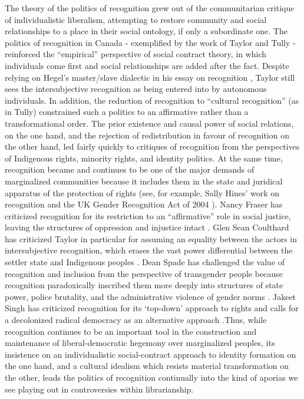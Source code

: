 \documentclass[12pt,oneside]{memoir}
\begin{document}
The theory of the politics of recognition grew out of the communitarian critique of individualistic liberalism, attempting to restore community and social relationships to a place in their social ontology, if only a subordinate one. The politics of recognition in Canada - exemplified by the work of Taylor and Tully - reinforced the ``empirical'' perspective of social contract theory, in which individuals come first and social relationships are added after the fact. Despite relying on Hegel's master/slave dialectic in his essay on recognition \citep{Taylor1992}, Taylor still sees the intersubjective recognition as being entered into by autonomous individuals. In addition, the reduction of recognition to ``cultural recognition'' (as in Tully) constrained such a politics to an affirmative rather than a transformational order.
The prior existence and causal power of social relations, on the one hand, and the rejection of redistribution in favour of recognition on the other hand, led fairly quickly to critiques of recognition from the perspectives of Indigenous rights, minority rights, and identity politics. At the same time, recognition became and continues to be one of the major demands of marginalized communities because it includes them in the state and juridical apparatus of the protection of rights (see, for example, Sally Hines' work on recognition and the UK Gender Recognition Act of 2004 \citep{Hines2013}). Nancy Fraser has criticized recognition for its restriction to an ``affirmative'' role in social justice, leaving the structures of oppression and injustice intact \citep{fraser-justice, fraser-honneth}. Glen Sean Coulthard has criticized Taylor in particular for assuming an equality between the actors in intersubjective recognition, which erases the vast power differential between the settler state and Indigenous peoples \citep{coulthard2014}. Dean Spade has challenged the value of recognition and inclusion from the perspective of transgender people because recognition paradoxically inscribed them more deeply into structures of state power, police brutality, and the administrative violence of gender norms \citep{Spade2015}. Jakeet Singh has criticized recognition for its `top-down' approach to rights \citep{singh-recognition} and calls for a decolonized radical democracy as an alternative approach \citep{singh-democracy}.Thus, while recognition continues to be an important tool in the construction and maintenance of liberal-democratic hegemony over marginalized peoples, its insistence on an individualistic social-contract approach to identity formation on the one hand, and a cultural idealism which resists material transformation on the other, leads the politics of recognition continually into the kind of aporias we see playing out in controversies within librarianship. 

\backmatter

 

\end{document}
